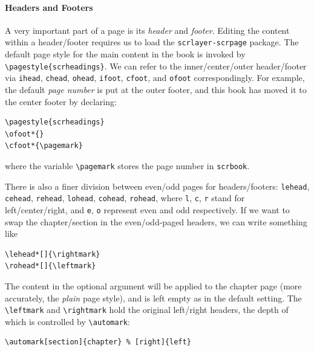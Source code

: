 \paragraph{Headers and Footers}
A very important part of a page is its \textit{header} and \textit{footer}. Editing the content within a header/footer requires us to load the \texttt{scrlayer-\allowbreak scrpage} package. The default page style for the main content in the book is invoked by \texttt{\textbackslash pagestyle\{scrheadings\}}. We can refer to the inner/center/outer header/footer via \texttt{ihead}, \texttt{chead}, \texttt{ohead}, \texttt{ifoot}, \texttt{cfoot}, and \texttt{ofoot} correspondingly. For example, the default \textit{page number} is put at the outer footer, and this book has moved it to the center footer by declaring:
\begin{lstlisting}
\pagestyle{scrheadings}
\ofoot*{}
\cfoot*{\pagemark}    
\end{lstlisting}
where the variable \texttt{\textbackslash pagemark} stores the page number in \texttt{scrbook}.

There is also a finer division between even/odd pages for headers/footers: \texttt{lehead}, \texttt{cehead}, \texttt{rehead}, \texttt{lohead}, \texttt{cohead}, \texttt{rohead}, where \texttt{l}, \texttt{c}, \texttt{r} stand for left/center/right, and \texttt{e}, \texttt{o} represent even and odd respectively. If we want to swap the chapter/section in the even/odd-paged headers, we can write something like
\begin{lstlisting}
\lehead*[]{\rightmark}
\rohead*[]{\leftmark}    
\end{lstlisting}
The content in the optional argument will be applied to the chapter page (more accurately, the \textit{plain} page style), and is left empty as in the default setting. The \texttt{\textbackslash leftmark} and \texttt{\textbackslash rightmark} hold the original left/right headers, the depth of which is controlled by \texttt{\textbackslash automark}:
\begin{lstlisting}
\automark[section]{chapter} % [right]{left}
\end{lstlisting}

